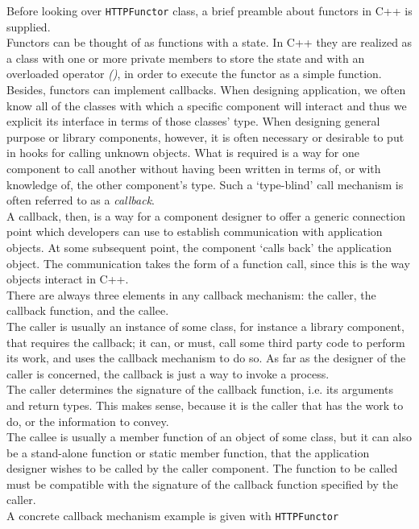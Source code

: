 Before looking over \texttt{HTTPFunctor} class, a brief preamble
about functors in C++ is supplied.
\\
Functors can be thought of as functions with a state. In C++ they
are realized
as a class with one or more private members to store the state
and with an overloaded operator \textit{()}, in order to execute the
functor as a simple function.
\\
Besides, functors can implement callbacks.
When designing application, we often know all of the classes
with which a specific component will interact and thus we explicit its
interface in terms of those classes' type. When designing general purpose
or library components, however, it is often necessary or desirable
to put in hooks for calling unknown objects. What is required is
a way for one component to call another without having been written
in terms of, or with knowledge of, the other component's type. Such a
`type-blind' call mechanism is often referred to as a \textit{callback}.
\\
A callback, then, is a way for a component designer to offer a generic
connection point which developers can use to establish communication
with application objects. At some subsequent point, the component `calls
back' the application object. The communication takes the form of a
function call, since this is the way objects interact in C++.
\\
There are always three elements in any callback mechanism: the caller, the
callback function, and the callee.
\\
The caller is usually an instance of some class, for instance a library
component, that requires the callback; it can, or must, call some
third party code to perform its work, and uses the callback mechanism
to do so. As far as the designer of the caller is concerned, the callback
is just a way to invoke a process.
\\
The caller determines the signature of the callback function, i.e. its
arguments and return types. This makes sense, because it is the caller
that has the work to do, or the information to convey.
\\
The callee is usually a member function of an object of some class, but it
can also be a stand-alone function or static member function, that the
application designer wishes to be called by the caller component.
The function to be called must be compatible with the
signature of the callback function specified by the caller.
\\
A concrete callback mechanism example is given with \texttt{HTTPFunctor}
